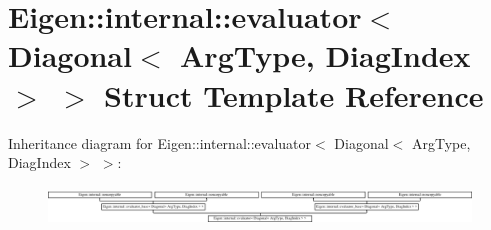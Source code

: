 \hypertarget{struct_eigen_1_1internal_1_1evaluator_3_01_diagonal_3_01_arg_type_00_01_diag_index_01_4_01_4}{}\section{Eigen\+:\+:internal\+:\+:evaluator$<$ Diagonal$<$ Arg\+Type, Diag\+Index $>$ $>$ Struct Template Reference}
\label{struct_eigen_1_1internal_1_1evaluator_3_01_diagonal_3_01_arg_type_00_01_diag_index_01_4_01_4}
Inheritance diagram for Eigen\+:\+:internal\+:\+:evaluator$<$ Diagonal$<$ Arg\+Type, Diag\+Index $>$ $>$\+:\begin{figure}[H]
\begin{center}
\leavevmode
\includegraphics[height=1.037037cm]{struct_eigen_1_1internal_1_1evaluator_3_01_diagonal_3_01_arg_type_00_01_diag_index_01_4_01_4}
\end{center}
\end{figure}
